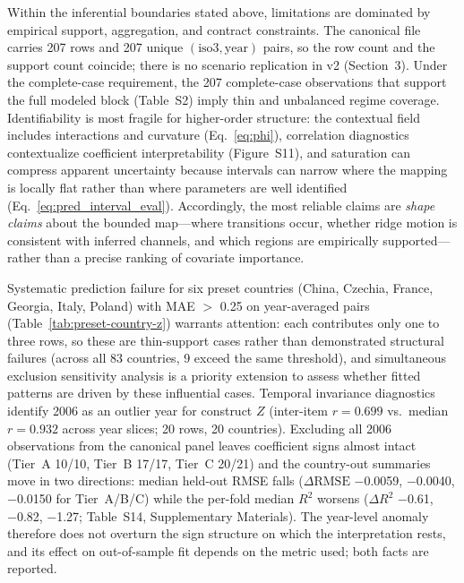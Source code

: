 \documentclass[11pt]{article}
\begin{document}
Within the inferential boundaries stated above, limitations are dominated by empirical support, aggregation, and contract constraints. The canonical file carries 207 rows and 207 unique $(\text{iso3},\text{year})$ pairs, so the row count and the support count coincide; there is no scenario replication in v2 (Section~3). Under the complete-case requirement, the 207 complete-case observations that support the full modeled block (Table~S2) imply thin and unbalanced regime coverage. Identifiability is most fragile for higher-order structure: the contextual field includes interactions and curvature (Eq.~\eqref{eq:phi}), correlation diagnostics contextualize coefficient interpretability (Figure~S11), and saturation can compress apparent uncertainty because intervals can narrow where the mapping is locally flat rather than where parameters are well identified (Eq.~\eqref{eq:pred_interval_eval}). Accordingly, the most reliable claims are \emph{shape claims} about the bounded map---where transitions occur, whether ridge motion is consistent with inferred channels, and which regions are empirically supported---rather than a precise ranking of covariate importance.

Systematic prediction failure for six preset countries (China, Czechia, France, Georgia, Italy, Poland) with MAE $>$ 0.25 on year-averaged pairs (Table~\ref{tab:preset-country-z}) warrants attention: each contributes only one to three rows, so these are thin-support cases rather than demonstrated structural failures (across all 83 countries, 9 exceed the same threshold), and simultaneous exclusion sensitivity analysis is a priority extension to assess whether fitted patterns are driven by these influential cases. Temporal invariance diagnostics identify 2006 as an outlier year for construct $Z$ (inter-item $r = 0.699$ vs.\ median $r = 0.932$ across year slices; 20 rows, 20 countries). Excluding all 2006 observations from the canonical panel leaves coefficient signs almost intact (Tier~A 10/10, Tier~B 17/17, Tier~C 20/21) and the country-out summaries move in two directions: median held-out RMSE falls ($\Delta\mathrm{RMSE}$ \num{-0.0059}, \num{-0.0040}, \num{-0.0150} for Tier~A/B/C) while the per-fold median $R^2$ worsens ($\Delta R^2$ \num{-0.61}, \num{-0.82}, \num{-1.27}; Table~S14, Supplementary Materials). The year-level anomaly therefore does not overturn the sign structure on which the interpretation rests, and its effect on out-of-sample fit depends on the metric used; both facts are reported.
\end{document}
